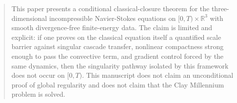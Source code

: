 \begin{abstract}
This paper presents a conditional classical-closure theorem for the three-dimensional incompressible Navier-Stokes equations on \([0,T)\times\mathbb{R}^3\) with smooth divergence-free finite-energy data. The claim is limited and explicit: if one proves on the classical equation itself a quantified scale barrier against singular cascade transfer, nonlinear compactness strong enough to pass the convective term, and gradient control forced by the same dynamics, then the singularity pathway isolated by this framework does not occur on \([0,T)\). This manuscript does not claim an unconditional proof of global regularity and does not claim that the Clay Millennium problem is solved.
\end{abstract}
